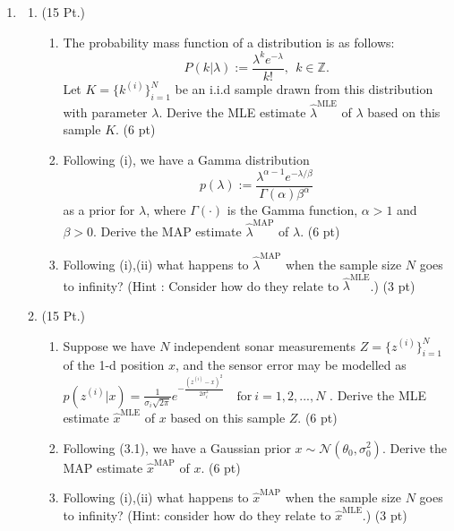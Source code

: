 \documentclass{article}
\theoremstyle{definition}
\theoremstyle{remark}
\newenvironment{Q}
        {%
          \clearpage
          \item
        }
        {%
          \phantom{s} 
          \bigskip
        }
\begin{document}
\begin{enumerate}[font={\Large\bfseries},left=0pt]
\begin{Q}
\begin{enumerate}
\begin{enumerate}
\end{enumerate}



\item (15 Pt.)


\begin{enumerate}
        

    \item The probability mass function of a distribution is as follows: 
    $$
        P(k|\lambda):=\frac{\lambda^ke^{-\lambda}}{k!},~~k\in \mathbb{Z}.
    $$
    Let $K=\{k^{(i)}\}_{i=1}^N$ be an i.i.d sample drawn from this distribution with parameter $\lambda$. Derive the MLE estimate $\widehat{\lambda}^{\text {MLE}}$ of $\lambda$ based on this sample $K$. (6 pt)

    \item Following (i), we have a Gamma distribution
    $$
        p(\lambda):=\frac{\lambda^{\alpha-1}e^{-\lambda/\beta}}{\Gamma(\alpha)\beta^\alpha}
    $$
    as a prior for $\lambda$, where $\Gamma(\cdot)$ is the Gamma function, $\alpha>1$ and $\beta>0$. Derive the MAP estimate $\widehat{\lambda}^{\text {MAP}}$ of $\lambda$. (6 pt)


  

        
    \item Following (i),(ii) what happens to $\widehat{\lambda}^{\text {MAP}}$ when the sample size $N$ goes to infinity? (Hint : Consider how do they relate to $\widehat{\lambda}^{\text {MLE}}$.) (3 pt)

\end{enumerate}


\item (15 Pt.)


\begin{enumerate}

    
    \item Suppose we have $N$ independent sonar measurements $Z=\{z^{(i)}\}_{i=1}^N$ of the 1-d position $x$, and the sensor error may be modelled as $p(z^{(i)}|x)= \frac{1}{\sigma_i\sqrt{2\pi}}e^{-\frac{(z^{(i)} - x)^2}{2\sigma_i^2}}\quad \text{for}\ i=1,2,...,N$ . Derive the MLE estimate $\widehat{x}^{\text {MLE}}$ of $x$ based on this sample $Z$. (6 pt)
    
    \item Following (3.1), we have a Gaussian prior $x \sim \mathcal{N} (\theta_0, \sigma_{0}^2)$.
    Derive the MAP estimate $\widehat{x}^{\text {MAP}}$ of $x$. (6 pt)

    \item Following (i),(ii) what happens to $\widehat{x}^{\text {MAP}}$ when the sample size $N$ goes to infinity? (Hint: consider how do they relate to $\widehat{x}^{\text {MLE}}$.) (3 pt)
\end{enumerate}


\end{enumerate}
\end{Q}
\end{enumerate}
\end{document}
